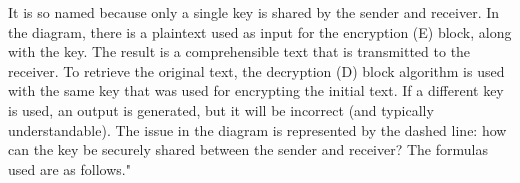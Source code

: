 It is so named because only a single key is shared by the sender and receiver. In the diagram, there is a plaintext used as input for the encryption (E) block, along with the key. The result is a comprehensible text that is transmitted to the receiver. To retrieve the original text, the decryption (D) block algorithm is used with the same key that was used for encrypting the initial text. If a different key is used, an output is generated, but it will be incorrect (and typically understandable). The issue in the diagram is represented by the dashed line: how can the key be securely shared between the sender and receiver? The formulas used are as follows."